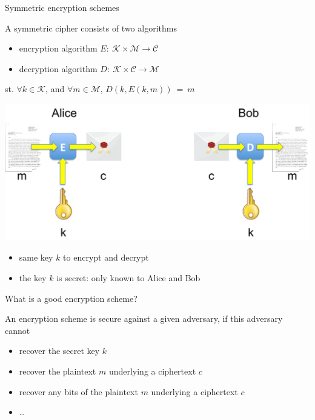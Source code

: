 \documentclass[aspectratio=169, lualatex, handout, 10pt,dvipsnames,svgnames]{beamer} %
\begin{document}
\begin{frame}{Symmetric encryption schemes}
  \vspace{-0.5cm}
  \begin{block}{}
    A symmetric cipher consists of two algorithms
    \begin{itemize}
    \item encryption algorithm $E:\ \mathcal{K} \times \mathcal{M} \rightarrow \mathcal{C}$
      
    \item decryption algorithm $D:\ \mathcal{K} \times \mathcal{C} \rightarrow \mathcal{M}$
    \end{itemize}
    st. $\forall k\in\mathcal{K}$, and $\forall m\in\mathcal{M}$, $D(k, E(k, m))\ =\ m$
  \end{block}
  
  \begin{center}
    \includegraphics[scale=0.25]{Images/encryptA.pdf}
  \end{center}
  \begin{itemize}
  \item same key $k$ to encrypt and decrypt
    
  \item the key $k$ is secret: only known to Alice and Bob 
  \end{itemize}
  
\end{frame}

\begin{frame}{What is a good encryption scheme?}

  An encryption scheme is secure against a given adversary, if this adversary cannot
  
  \begin{itemize}
  \item recover the secret key $k$
  \item recover the plaintext $m$ underlying a ciphertext $c$
  \item recover any bits of the plaintext $m$ underlying a ciphertext $c$
  \item \dots    
  \end{itemize}
\end{frame}
\end{document}
